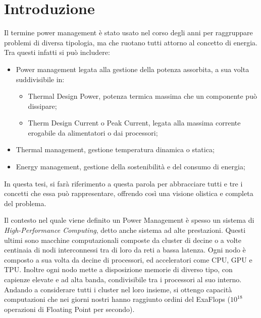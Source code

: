 \chapter{Introduzione}
Il termine power management è stato usato nel corso degli anni per raggruppare problemi di diversa tipologia, ma che ruotano tutti attorno al concetto di energia.
Tra questi infatti si può includere:
\begin{itemize}
    \item Power management legata alla gestione della potenza assorbita, a sua volta suddivisibile in:
    \begin{itemize}
        \item Thermal Design Power, potenza termica massima che un componente può dissipare;
        \item Therm Design Current o Peak Current, legata alla massima corrente erogabile da alimentatori o dai processori;
    \end{itemize}
    \item Thermal management, gestione temperatura dinamica o statica;
    \item Energy management, gestione della sostenibilità e del consumo di energia;
\end{itemize}

\noindent In questa tesi, si farà riferimento a questa parola per abbracciare tutti e tre i concetti che essa può rappresentare, offrendo così una visione olistica e completa del problema.

Il contesto nel quale viene definito un Power Management è spesso un sistema di \emph{High-Performance Computing}, detto anche sistema ad alte prestazioni. Questi ultimi sono macchine computazionali composte da cluster di decine o a volte centinaia di nodi interconnessi tra di loro da reti a bassa latenza. Ogni nodo è composto a sua volta da decine di processori, ed acceleratori come CPU, GPU e TPU. %
Inoltre ogni nodo mette a disposizione memorie di diverso tipo, con capienze elevate e ad alta banda, condivisibile tra i processori al suo interno. Andando a considerare tutti i cluster nel loro insieme, si ottengo capacità computazioni che nei giorni nostri hanno raggiunto ordini del ExaFlops ($10^{18}$ operazioni di Floating Point per secondo). 

